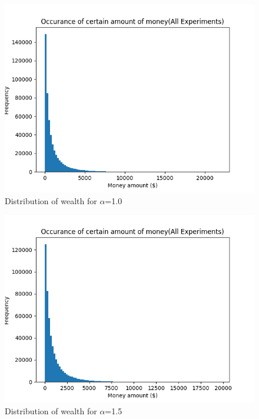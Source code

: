 \documentclass[12pt]{article} %
\begin{document}
\begin{figure}
	\includegraphics[scale=\scaleResultsC]{a1.png}
	\centering
	\caption{Distribution of wealth for $\alpha$=1.0}
	\label{fig:a1}
\end{figure}
\begin{figure}
	\includegraphics[scale=\scaleResultsC]{a1.5.png}
	\centering
	\caption{Distribution of wealth for $\alpha$=1.5}
	\label{fig:a1.5}
\end{figure}
\end{document}
